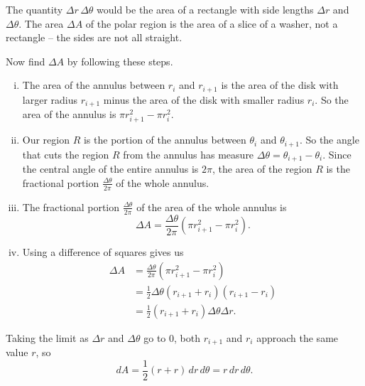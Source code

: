 \begin{smallhint}

\end{smallhint}
\begin{bighint}

\end{bighint}
\begin{activitySolution}
	\ba
	\item The quantity $\Delta r \, \Delta \theta$ would be the area of a rectangle with side lengths $\Delta r$ and $\Delta \theta$. The area $\Delta A$ of the polar region is the area of a slice of a washer, not a rectangle -- the sides are not all straight. 

	\item Now find $\Delta A$ by following these steps.
		\begin{enumerate}[i.]
		\item The area of the annulus between $r_i$ and $r_{i+1}$ is the area of the disk with larger radius $r_{i+1}$ minus the area of the disk with smaller radius $r_{i}$. So the area of the annulus is $\pi r^2_{i+1} - \pi r^2_{i}$. 

		\item Our region $R$ is the portion of the annulus between $\theta_{i}$ and $\theta_{i+1}$. So the angle that cuts the region $R$ from the annulus has measure $\Delta \theta = \theta_{i+1} - \theta_{i}$. Since the central angle of the entire annulus is $2 \pi$, the area of the region $R$ is the fractional portion $\frac{\Delta \theta}{2 \pi}$ of the whole annulus. 

		\item The fractional portion $\frac{\Delta \theta}{2 \pi}$ of the area of the whole annulus is 
\[\Delta A = \frac{\Delta \theta}{2 \pi} \left( \pi r^2_{i+1} - \pi r^2_{i} \right).\]

		\item Using a difference of squares gives us
\begin{align*}
\Delta A &= \frac{\Delta \theta}{2 \pi} \left( \pi r^2_{i+1} - \pi r^2_{i} \right) \\
	&= \frac{1}{2}\Delta \theta (r_{i+1} +  r_{i})(r_{i+1} -  r_{i}) \\
	&= \frac{1}{2}(r_{i+1} +  r_{i}) \Delta \theta  \Delta r.
\end{align*}
		
		\end{enumerate}
	
	\item Taking the limit as $\Delta r$ and $\Delta \theta$ go to 0, both $r_{i+1}$ and $r_i$ approach the same value $r$, so 
\[dA = \frac{1}{2}(r+r) \, dr \, d \theta = r \, dr \, d \theta.\]

	\ea
\end{activitySolution}
\aftera
